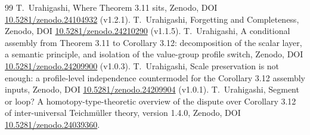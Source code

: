 \documentclass[11pt]{article}
\theoremstyle{definition}
\begin{document}
\begin{thebibliography}{99}
 T.~Urahigashi, Where Theorem 3.11 sits, Zenodo, DOI \href{https://doi.org/10.5281/zenodo.24104932}{10.5281/zenodo.24104932} (v1.2.1).
 T.~Urahigashi, Forgetting and Completeness, Zenodo, DOI \href{https://doi.org/10.5281/zenodo.24210290}{10.5281/zenodo.24210290} (v1.1.5).
 T.~Urahigashi, A conditional assembly from Theorem 3.11 to Corollary 3.12: decomposition of the scalar layer, a semantic principle, and isolation of the value-group profile switch, Zenodo, DOI \href{https://doi.org/10.5281/zenodo.24209900}{10.5281/zenodo.24209900} (v1.0.3).
 T.~Urahigashi, Scale preservation is not enough: a profile-level independence countermodel for the Corollary 3.12 assembly inputs, Zenodo, DOI \href{https://doi.org/10.5281/zenodo.24209904}{10.5281/zenodo.24209904} (v1.0.1).
 T.~Urahigashi, Segment or loop? A homotopy-type-theoretic overview of the dispute over Corollary 3.12 of inter-universal Teichm\"uller theory, version 1.4.0, Zenodo, DOI \href{https://doi.org/10.5281/zenodo.24039360}{10.5281/zenodo.24039360}.
\end{thebibliography}
\end{document}
